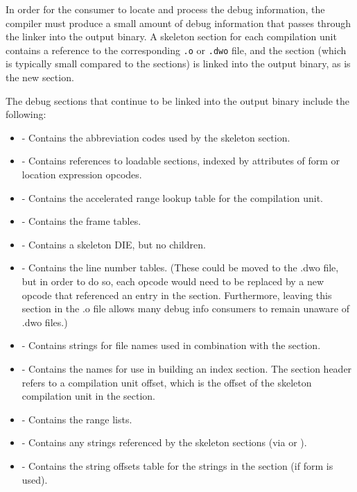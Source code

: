 In order for the consumer to locate and process the debug
information, the compiler must produce a small amount of debug
information that passes through the linker into the output
binary. A skeleton \dotdebuginfo{} section for each compilation unit
contains a reference to the corresponding \texttt{.o} or \texttt{.dwo}
file, and the \dotdebugline{} section (which is typically small
compared to the \dotdebuginfo{} sections) is
linked into the output binary, as is the new \dotdebugaddr{}
section.

The debug sections that continue to be linked into the
output binary include the following:
\begin{itemize}
\item
\dotdebugabbrev{} - Contains the abbreviation codes used by the
skeleton \dotdebuginfo{} section.
\item
\dotdebugaddr{} - Contains references to loadable sections,
indexed by attributes of form \DWFORMaddrx{} or location
expression 
\DWOPaddrx{} opcodes.
\item
\dotdebugaranges{} - Contains the accelerated range lookup table
for the compilation unit.
\item
\dotdebugframe{} - Contains the frame tables.
\item
\dotdebuginfo{} - Contains a skeleton \DWTAGcompileunit{} DIE,
but no children.
\item
\dotdebugline{} - Contains the line number tables.
(These could be moved to the .dwo file, but in
order to do so, each \DWLNEsetaddress{} opcode would need to
be replaced by a new opcode that referenced an entry in the
\dotdebugaddr{} section. Furthermore, leaving this section in the
.o file allows many debug info consumers to remain unaware of
.dwo files.)
\item
\dotdebuglinestr{} - Contains strings for file names used in
combination with the \dotdebugline{} section.
\item
\dotdebugnames{} - Contains the names for use in
building an index section. 
The section header refers to a
compilation unit offset, which is the offset of the
skeleton compilation unit in the \dotdebuginfo{} section.
\item
\dotdebugranges{} - Contains the range lists.
\item
\dotdebugstr{} - Contains any strings referenced by the skeleton
\dotdebuginfo{} sections (via \DWFORMstrp{} or \DWFORMstrx{}).
\item
\dotdebugstroffsets{} - Contains the string offsets table for
the strings in the \dotdebugstr{} section (if form \DWFORMstrx{} is used).
\end{itemize}

